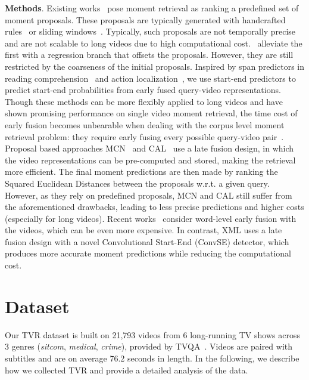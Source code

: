\documentclass[runningheads]{llncs}
\begin{document}
\kern2mm
\noindent\textbf{Methods}.
Existing works~\cite{anne2017localizing,gao2017tall,hendricks2018localizing,xu2019multilevel,ge2019mac,escorcia2019temporal} pose moment retrieval as ranking a predefined set of moment proposals.
These proposals are typically generated with handcrafted rules~\cite{anne2017localizing,hendricks2018localizing} or sliding windows~\cite{gao2017tall,xu2019multilevel,ge2019mac,escorcia2019temporal}. 
Typically, such proposals are not temporally precise and are not scalable to long videos due to high computational cost.~\cite{gao2017tall,xu2019multilevel,ge2019mac} alleviate the first with a regression branch that offsets the proposals. However, they are still restricted by the coarseness of the initial proposals. 
Inspired by span predictors in reading comprehension~\cite{seo2016bidirectional,chen2017reading} and action localization~\cite{lin2018bsn}, we use start-end predictors to predict start-end probabilities from early fused query-video representations. 
Though these methods can be more flexibly applied to long videos and have shown promising performance on single video moment retrieval, the time cost of early fusion becomes unbearable when dealing with the corpus level moment retrieval problem: they require early fusing every possible query-video pair~\cite{escorcia2019temporal}.
Proposal based approaches MCN~\cite{anne2017localizing} and CAL~\cite{escorcia2019temporal} use a late fusion design, in which the video representations can be pre-computed and stored, making the retrieval more efficient. 
The final moment predictions are then made by ranking the Squared Euclidean Distances between the proposals w.r.t. a given query.
However, as they rely on predefined proposals, MCN and CAL still suffer from the aforementioned drawbacks, leading to less precise predictions and higher costs (especially for long videos).
Recent works~\cite{Zhang2018MANMA,chen2018temporally,zhang2019cross} consider word-level early fusion with the videos, which can be even more expensive.
In contrast, XML uses a late fusion design with a novel Convolutional Start-End (ConvSE) detector, which produces more accurate moment predictions while reducing the computational cost.
 \section{Dataset}\label{sec:dataset}
Our TVR dataset is built on 21,793 videos from 6 long-running TV shows across 3 genres (\textit{sitcom}, \textit{medical}, \textit{crime}), provided by TVQA~\cite{Lei2018TVQALC}. 
Videos are paired with subtitles and are on average 76.2 seconds in length. 
In the following, we describe how we collected TVR and provide a detailed analysis of the data.
\end{document}
